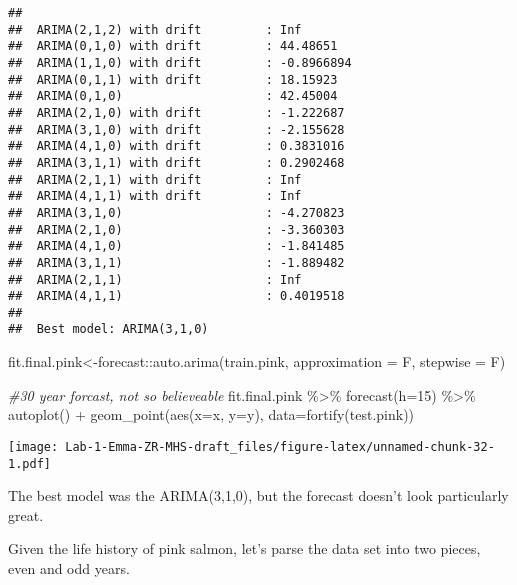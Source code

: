 \documentclass[
]{article}
\newenvironment{Shaded}{\begin{snugshade}}{\end{snugshade}}
\newcommand{\AttributeTok}[1]{\textcolor[rgb]{0.77,0.63,0.00}{#1}}
\newcommand{\CommentTok}[1]{\textcolor[rgb]{0.56,0.35,0.01}{\textit{#1}}}
\newcommand{\DecValTok}[1]{\textcolor[rgb]{0.00,0.00,0.81}{#1}}
\newcommand{\FunctionTok}[1]{\textcolor[rgb]{0.00,0.00,0.00}{#1}}
\newcommand{\NormalTok}[1]{#1}
\newcommand{\OtherTok}[1]{\textcolor[rgb]{0.56,0.35,0.01}{#1}}
\newcommand{\SpecialCharTok}[1]{\textcolor[rgb]{0.00,0.00,0.00}{#1}}
\begin{document}
\begin{verbatim}
## 
##  ARIMA(2,1,2) with drift         : Inf
##  ARIMA(0,1,0) with drift         : 44.48651
##  ARIMA(1,1,0) with drift         : -0.8966894
##  ARIMA(0,1,1) with drift         : 18.15923
##  ARIMA(0,1,0)                    : 42.45004
##  ARIMA(2,1,0) with drift         : -1.222687
##  ARIMA(3,1,0) with drift         : -2.155628
##  ARIMA(4,1,0) with drift         : 0.3831016
##  ARIMA(3,1,1) with drift         : 0.2902468
##  ARIMA(2,1,1) with drift         : Inf
##  ARIMA(4,1,1) with drift         : Inf
##  ARIMA(3,1,0)                    : -4.270823
##  ARIMA(2,1,0)                    : -3.360303
##  ARIMA(4,1,0)                    : -1.841485
##  ARIMA(3,1,1)                    : -1.889482
##  ARIMA(2,1,1)                    : Inf
##  ARIMA(4,1,1)                    : 0.4019518
## 
##  Best model: ARIMA(3,1,0)
\end{verbatim}

\begin{Shaded}
\begin{Highlighting}[]
\NormalTok{fit.final.pink}\OtherTok{\textless{}{-}}\NormalTok{forecast}\SpecialCharTok{::}\FunctionTok{auto.arima}\NormalTok{(train.pink, }\AttributeTok{approximation =}\NormalTok{ F, }\AttributeTok{stepwise =}\NormalTok{ F)}

\CommentTok{\#30 year forcast, not so believeable}
\NormalTok{fit.final.pink }\SpecialCharTok{\%\textgreater{}\%}
  \FunctionTok{forecast}\NormalTok{(}\AttributeTok{h=}\DecValTok{15}\NormalTok{) }\SpecialCharTok{\%\textgreater{}\%}
  \FunctionTok{autoplot}\NormalTok{() }\SpecialCharTok{+} \FunctionTok{geom\_point}\NormalTok{(}\FunctionTok{aes}\NormalTok{(}\AttributeTok{x=}\NormalTok{x, }\AttributeTok{y=}\NormalTok{y), }\AttributeTok{data=}\FunctionTok{fortify}\NormalTok{(test.pink))}
\end{Highlighting}
\end{Shaded}

\texttt{[image: Lab-1-Emma-ZR-MHS-draft\_files/figure-latex/unnamed-chunk-32-1.pdf]}

The best model was the ARIMA(3,1,0), but the forecast doesn't look
particularly great.

Given the life history of pink salmon, let's parse the data set into two
pieces, even and odd years.
\end{document}
